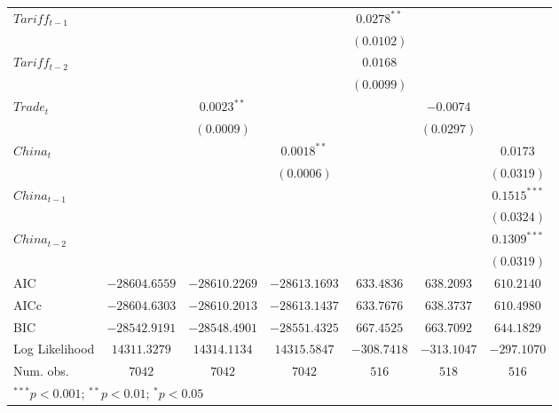 \begin{table}
\begin{center}
\begin{tabular}{l c c c c c c}
$Tariff_{t-1}$ &                 &                 &                 & $0.0278^{**}$   &                 &                 \\
               &                 &                 &                 & $(0.0102)$      &                 &                 \\
$Tariff_{t-2}$ &                 &                 &                 & $0.0168$        &                 &                 \\
               &                 &                 &                 & $(0.0099)$      &                 &                 \\
$Trade_{t}$    &                 & $0.0023^{**}$   &                 &                 & $-0.0074$       &                 \\
               &                 & $(0.0009)$      &                 &                 & $(0.0297)$      &                 \\
$China_{t}$    &                 &                 & $0.0018^{**}$   &                 &                 & $0.0173$        \\
               &                 &                 & $(0.0006)$      &                 &                 & $(0.0319)$      \\
$China_{t-1}$  &                 &                 &                 &                 &                 & $0.1515^{***}$  \\
               &                 &                 &                 &                 &                 & $(0.0324)$      \\
$China_{t-2}$  &                 &                 &                 &                 &                 & $0.1309^{***}$  \\
               &                 &                 &                 &                 &                 & $(0.0319)$      \\
\hline
AIC            & $-28604.6559$   & $-28610.2269$   & $-28613.1693$   & $633.4836$      & $638.2093$      & $610.2140$      \\
AICc           & $-28604.6303$   & $-28610.2013$   & $-28613.1437$   & $633.7676$      & $638.3737$      & $610.4980$      \\
BIC            & $-28542.9191$   & $-28548.4901$   & $-28551.4325$   & $667.4525$      & $663.7092$      & $644.1829$      \\
Log Likelihood & $14311.3279$    & $14314.1134$    & $14315.5847$    & $-308.7418$     & $-313.1047$     & $-297.1070$     \\
Num. obs.      & $7042$          & $7042$          & $7042$          & $516$           & $518$           & $516$           \\
\hline
\multicolumn{7}{l}{\scriptsize{$^{***}p<0.001$; $^{**}p<0.01$; $^{*}p<0.05$}}
\end{tabular}
\label{tab:armax_term}
\end{center}
\end{table}

